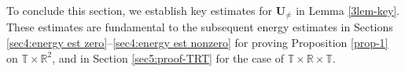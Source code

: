 \documentclass[11pt,reqno]{article}
\numberwithin{equation}{section}
\newcommand\R{{\mathbb R}}
\newcommand\T{{\mathbb T}}
\newcommand\U{\bm{U}}
\begin{document}
To conclude this section, we establish key estimates for $\U_{\neq}$ in Lemma \ref{3lem-key}. 
These estimates are fundamental to the subsequent energy estimates in Sections \ref{sec4:energy est zero}–\ref{sec4:energy est nonzero} for proving Proposition \ref{prop-1} on $\T\times\R^2$, and in Section \ref{sec5:proof-TRT} for the case of $\T\times\R\times\T$.

\end{document}
